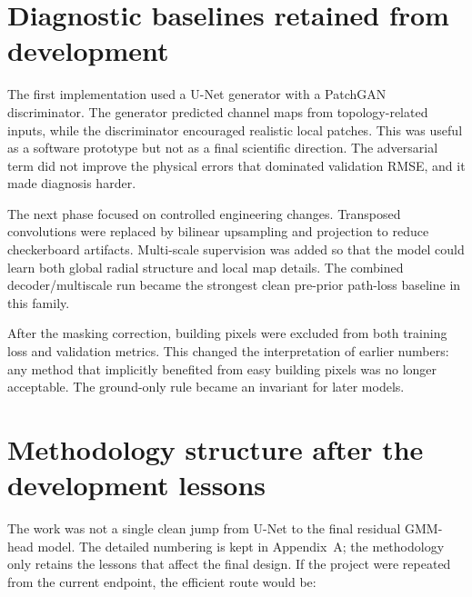 \section{Diagnostic baselines retained from development}

The first implementation used a U-Net generator with a PatchGAN discriminator.
The generator predicted channel maps from topology-related inputs, while the
discriminator encouraged realistic local patches. This was useful as a
software prototype but not as a final scientific direction. The adversarial
term did not improve the physical errors that dominated validation RMSE, and it
made diagnosis harder.

The next phase focused on controlled engineering changes. Transposed
convolutions were replaced by bilinear upsampling and projection to reduce
checkerboard artifacts. Multi-scale supervision was added so that the model
could learn both global radial structure and local map details. The combined
decoder/multiscale run became
the strongest clean pre-prior path-loss baseline in this family.

After the masking correction, building pixels were excluded from both training loss and
validation metrics. This changed the interpretation of earlier numbers: any
method that implicitly benefited from easy building pixels was no longer
acceptable. The ground-only rule became an invariant for later models.

\section{Methodology structure after the development lessons}

The work was not a single clean jump from U-Net to the final residual GMM-head
model. The detailed numbering is kept in Appendix~A; the methodology only
retains the lessons that affect the final design. If the project were repeated
from the current endpoint, the efficient route would be:

